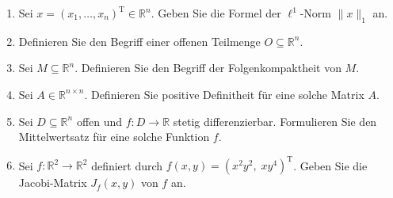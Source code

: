 \begin{enumerate}
\item Sei $x=(x_1,\dots,x_n)^{\mathrm T}\in\mathbb{R}^n$. Geben Sie die Formel der \(\ell^1\)-Norm \(\|x\|_1\) an.\\

\item Definieren Sie den Begriff einer offenen Teilmenge $O\subseteq\mathbb{R}^n$.\\

\item Sei $M\subseteq\mathbb{R}^n$. Definieren Sie den Begriff der Folgenkompaktheit von $M$.\\

\item Sei $A\in\mathbb{R}^{n\times n}$. Definieren Sie positive Definitheit für eine solche Matrix $A$.\\

\item Sei $D\subseteq\mathbb{R}^n$ offen und $f:D\to\mathbb{R}$ stetig differenzierbar. Formulieren Sie den Mittelwertsatz für eine solche Funktion $f$.\\

\item Sei $f:\mathbb{R}^2\to\mathbb{R}^2$ definiert durch $f(x,y)=(x^2y^2,\;xy^4)^{\mathrm T}$. Geben Sie die Jacobi-Matrix $J_f(x,y)$ von $f$ an.\\


\end{enumerate}

